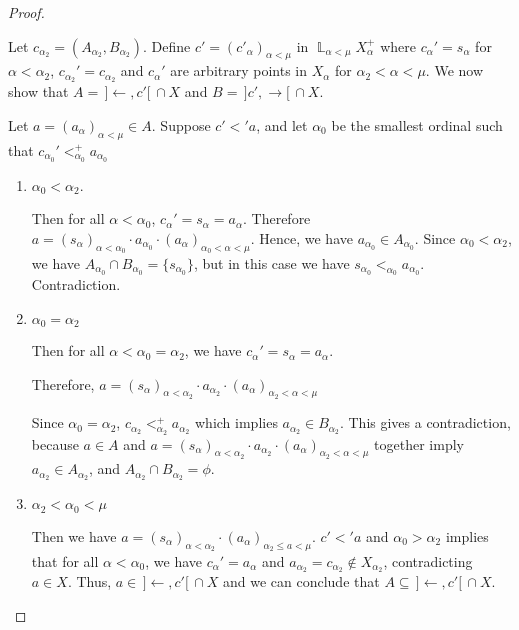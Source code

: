 \documentclass[12pt,oneside,english]{amsbook}
\numberwithin{equation}{section} %
\numberwithin{figure}{section} %
\theoremstyle{plain}
\numberwithin{section}{chapter}
\theoremstyle{plain}
\DeclareMathOperator{\LP}{\mathbb{L}}
\begin{document}
\begin{proof}
\begin{enumerate}
  Let $c_{\alpha_{2}}  =  (A_{\alpha_{2}}, B_{\alpha_{2}})$. Define $c' =(c'_{\alpha})_{\alpha < \mu}$ in $\LP_{\alpha < \mu}X_{\alpha}^+$ where $c_{\alpha}' = s_{\alpha}$ for $\alpha < \alpha_2$, $c_{\alpha_2}' = c_{\alpha_2}$ and $c_{\alpha}'$ are arbitrary points in $X_{\alpha}$ for $\alpha_2 < \alpha < \mu$. We now show that
  $ A  = \, ]\leftarrow, c'[ \, \cap X $ and $B = \, ] c', \rightarrow [ \, \cap X$.

  Let $a  =  (a_{\alpha})_{\alpha < \mu}  \in A$. Suppose $c' <' a$, and let $\alpha_{0}$ be the smallest ordinal such that $c_{\alpha_{0}}' <_{\alpha_{0}}^+ a_{\alpha_{0}}$
  \begin{enumerate}
  \item $\alpha_{0} < \alpha_{2}$.
    
    Then for all $\alpha < \alpha_{0}$, $c_{\alpha}'  =  s_{\alpha}  =  a_{\alpha}$. Therefore $a  =  (s_{\alpha})_{\alpha < \alpha_{0}} \cdot a_{\alpha_{0}} \cdot (a_{\alpha})_{\alpha_{0} < \alpha < \mu}$. Hence, we have $a_{\alpha_{0}}  \in A_{\alpha_{0}}$. Since $\alpha_{0} < \alpha_{2}$, we have $A_{\alpha_{0}} \cap B_{\alpha_{0}}  =  \{s_{\alpha_{0}} \}$, but in this case we have $s_{\alpha_{0}} <_{\alpha_0} a_{\alpha_{0}}$. Contradiction.
    
  \item $\alpha_{0}  =  \alpha_{2}$
    
    Then for all $\alpha < \alpha_{0}  =  \alpha_{2}$, we have $c_{\alpha}'  =  s_{\alpha}  =  a_{\alpha}$.
    
    Therefore, $a  =  (s_{\alpha})_{\alpha < \alpha_{2}} \cdot a_{\alpha_{2}} \cdot (a_{\alpha})_{\alpha_{2} < \alpha < \mu}$
    
    Since $\alpha_0 = \alpha_2$, $ c_{\alpha_{2}}  <_{\alpha_{2}}^+  a_{\alpha_{2}}$ which implies $a_{\alpha_{2}}  \in  B_{\alpha_{2}}$. This gives a contradiction, because $a  \in  A$ and $a  =  (s_{\alpha})_{\alpha < \alpha_{2}} \cdot a_{\alpha_{2}} \cdot (a_{\alpha})_{\alpha_{2} < \alpha < \mu}$ together imply $a_{\alpha_{2}}  \in  A_{\alpha_{2}}$, and $A_{\alpha_{2}} \cap B_{\alpha_{2}}  =  \phi$.
  \item $\alpha_{2} < \alpha_{0} < \mu$
    
    Then we have $a  =  (s_{\alpha})_{\alpha < \alpha_{2}} \cdot (a_{\alpha})_{\alpha_{2} \leq a < \mu}$.
    $c' <' a$ and $\alpha_{0} > \alpha_{2}$ implies that for all $\alpha < \alpha_{0}$, we have $c_{\alpha}'  =  a_{\alpha}$ and $a_{\alpha_{2}}  =  c_{\alpha_{2}}  \notin X_{\alpha_{2}}$, contradicting $a  \in  X$. Thus, $a  \in \, ]\leftarrow, c' [ \, \cap X$ and  we can conclude that $A  \subseteq \, ]\leftarrow, c' [ \, \cap X$. 
  \end{enumerate}
    

\end{enumerate}
\end{proof}
\end{document}
